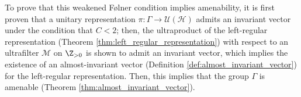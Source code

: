 To prove that this weakened Følner condition implies amenability, it is first proven that a unitary representation $\pi\colon \Gamma\rightarrow \mathcal{U}\left( \mathcal{H} \right)$ admits an invariant vector under the condition that $C < 2$; then, the ultraproduct of the left-regular representation (Theorem \ref{thm:left_regular_representation}) with respect to an ultrafilter $\mathcal{M}$ on $\N$ is shown to admit an invariant vector, which implies the existence of an almost-invariant vector (Definition \ref{def:almost_invariant_vector}) for the left-regular representation. Then, this implies that the group $\Gamma$ is amenable (Theorem \ref{thm:almost_invariant_vector}).\newline
